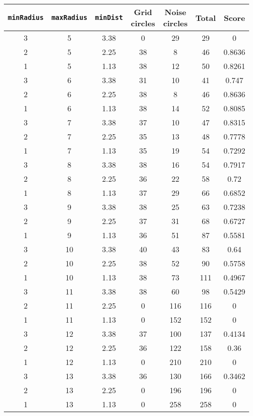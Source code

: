 \documentclass[letterpaper, 12pt]{article}
\begin{document}
\begin{longtable}{|c|c|c|c|c|c|c|}
\hline
\textbf{\texttt{minRadius}} & \textbf{\texttt{maxRadius}} & \textbf{\texttt{minDist}} & \textbf{Grid circles} & \textbf{Noise circles} & \textbf{Total} & \textbf{Score} \\
\hline
3 & 5 & 3.38 & 0 & 29 & 29 & 0 \\
\hline
2 & 5 & 2.25 & 38 & 8 & 46 & 0.8636 \\
\hline
1 & 5 & 1.13 & 38 & 12 & 50 & 0.8261 \\
\hline
3 & 6 & 3.38 & 31 & 10 & 41 & 0.747 \\
\hline
2 & 6 & 2.25 & 38 & 8 & 46 & 0.8636 \\
\hline
1 & 6 & 1.13 & 38 & 14 & 52 & 0.8085 \\
\hline
3 & 7 & 3.38 & 37 & 10 & 47 & 0.8315 \\
\hline
2 & 7 & 2.25 & 35 & 13 & 48 & 0.7778 \\
\hline
1 & 7 & 1.13 & 35 & 19 & 54 & 0.7292 \\
\hline
3 & 8 & 3.38 & 38 & 16 & 54 & 0.7917 \\
\hline
2 & 8 & 2.25 & 36 & 22 & 58 & 0.72 \\
\hline
1 & 8 & 1.13 & 37 & 29 & 66 & 0.6852 \\
\hline
3 & 9 & 3.38 & 38 & 25 & 63 & 0.7238 \\
\hline
2 & 9 & 2.25 & 37 & 31 & 68 & 0.6727 \\
\hline
1 & 9 & 1.13 & 36 & 51 & 87 & 0.5581 \\
\hline
3 & 10 & 3.38 & 40 & 43 & 83 & 0.64 \\
\hline
2 & 10 & 2.25 & 38 & 52 & 90 & 0.5758 \\
\hline
1 & 10 & 1.13 & 38 & 73 & 111 & 0.4967 \\
\hline
3 & 11 & 3.38 & 38 & 60 & 98 & 0.5429 \\
\hline
2 & 11 & 2.25 & 0 & 116 & 116 & 0 \\
\hline
1 & 11 & 1.13 & 0 & 152 & 152 & 0 \\
\hline
3 & 12 & 3.38 & 37 & 100 & 137 & 0.4134 \\
\hline
2 & 12 & 2.25 & 36 & 122 & 158 & 0.36 \\
\hline
1 & 12 & 1.13 & 0 & 210 & 210 & 0 \\
\hline
3 & 13 & 3.38 & 36 & 130 & 166 & 0.3462 \\
\hline
2 & 13 & 2.25 & 0 & 196 & 196 & 0 \\
\hline
1 & 13 & 1.13 & 0 & 258 & 258 & 0 \\

\end{longtable}
\end{document}
